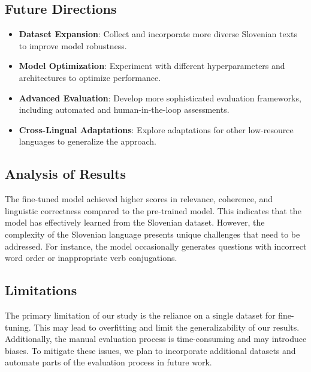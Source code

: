 \documentclass[fleqn,moreauthors,10pt]{ds_report}
\begin{document}
\subsection*{Future Directions}
\begin{itemize}[noitemsep]
    \item \textbf{Dataset Expansion}: Collect and incorporate more diverse Slovenian texts to improve model robustness.
    \item \textbf{Model Optimization}: Experiment with different hyperparameters and architectures to optimize performance.
    \item \textbf{Advanced Evaluation}: Develop more sophisticated evaluation frameworks, including automated and human-in-the-loop assessments.
    \item \textbf{Cross-Lingual Adaptations}: Explore adaptations for other low-resource languages to generalize the approach.
\end{itemize}

\subsection*{Analysis of Results}
The fine-tuned model achieved higher scores in relevance, coherence, and linguistic correctness compared to the pre-trained model. This indicates that the model has effectively learned from the Slovenian dataset. However, the complexity of the Slovenian language presents unique challenges that need to be addressed. For instance, the model occasionally generates questions with incorrect word order or inappropriate verb conjugations.

\subsection*{Limitations}
The primary limitation of our study is the reliance on a single dataset for fine-tuning. This may lead to overfitting and limit the generalizability of our results. Additionally, the manual evaluation process is time-consuming and may introduce biases. To mitigate these issues, we plan to incorporate additional datasets and automate parts of the evaluation process in future work.
\end{document}
